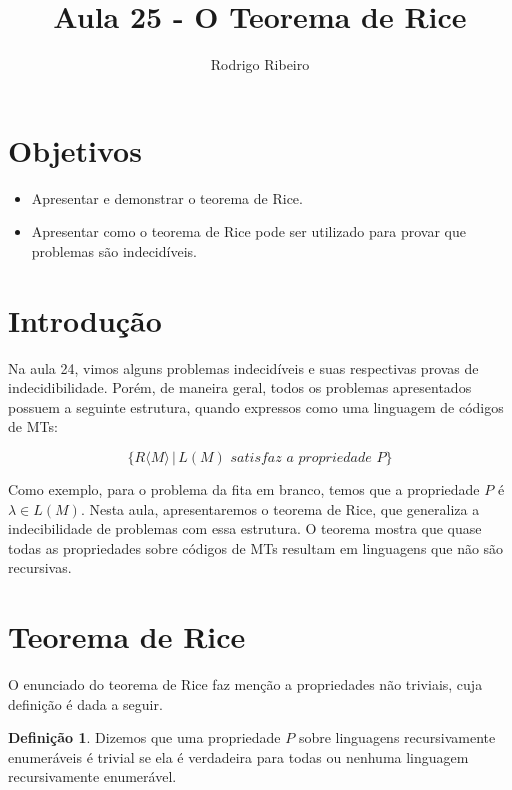 \documentclass[a4paper]{article}
\theoremstyle{definition}
\newtheorem{Definition}{Definição}
\begin{document}
\title{Aula 25 - O Teorema de Rice}
  \author{Rodrigo Ribeiro}

  \maketitle

  \pagestyle{fancy}


  \section*{Objetivos}

  \begin{itemize}
    \item Apresentar e demonstrar o teorema de Rice.
    \item Apresentar como o teorema de Rice pode ser utilizado para
          provar que problemas são indecidíveis.
  \end{itemize}


  \section{Introdução}

  Na aula 24, vimos alguns problemas indecidíveis e suas respectivas provas de
  indecidibilidade. Porém, de maneira geral, todos os problemas apresentados
  possuem a seguinte estrutura, quando expressos como uma linguagem de códigos
  de MTs:

  \[
    \{R\langle M \rangle\,|\, L(M) \textit{ satisfaz a propriedade }P\}
  \]

  Como exemplo, para o problema da fita em branco, temos que a propriedade $P$ é
  $\lambda \in L(M)$. Nesta aula, apresentaremos o teorema de Rice, que
  generaliza a indecibilidade de problemas com essa estrutura. O teorema mostra
  que quase todas as propriedades sobre códigos de MTs resultam em linguagens
  que não são recursivas.

  \section{Teorema de Rice}

  O enunciado do teorema de Rice faz menção a propriedades não triviais, cuja
  definição é dada a seguir.

  \begin{Definition}
    Dizemos que uma propriedade $P$ sobre linguagens recursivamente enumeráveis
    é trivial se ela é verdadeira para todas ou nenhuma linguagem recursivamente
    enumerável. 
  \end{Definition}
\end{document}
